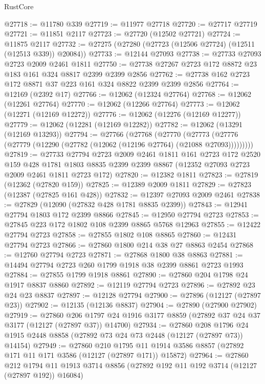 \begin{lexlean}{RustCore}
\begin{coremodule}
@27718 := @11780 @339
@27719 := @11977 @27718
@27720 := @27717 @27719
@27721 := @11851 @2117
@27723 := @27720 (@12502 @27721)
@27724 := @11875 @2117
@27732 := @27275 (@27280 (@27723 (@12506 @27724) (@12511 (@12513 @339)) @20084))
@27733 := @12144 @27093
@27738 := @27733 @27093 @2723 @2009 @2461 @1811
@27750 := @27738 @27267 @2723 @172 @8872 @23 @183 @161 @324 @8817 @2399 @2399 @2856
@27762 := @27738 @162 @2723 @172 @8871 @37 @223 @161 @324 @8822 @2399 @2399 @2856
@27764 := @12169 (@2392 @17)
@27766 := @12062 (@12324 @27764)
@27768 := @12062 (@12261 @27764)
@27770 := @12062 (@12266 @27764)
@27773 := @12062 (@12271 (@12169 @12272))
@27776 := @12062 (@12276 (@12169 @12277))
@27779 := @12062 (@12281 (@12169 @12282))
@27782 := @12062 (@13291 (@12169 @13293))
@27794 := @27766
    (@27768
      (@27770
        (@27773 (@27776 (@27779 (@12290 (@27782 (@12062 (@12196 @27764) (@21088 @27093)))))))))
@27819 := @27733
    @27794
    @2723
    @2009
    @2461
    @1811
    @161
    @2723
    @172
    @2520
    @159
    @428
    @1781
    @1803
    @8835
    @2399
    @2399
    @8867
    (@12352 @27093 @2723 @2009 @2461 @1811 @2723 @172)
@27820 := @12382 @1811
@27823 := @27819 (@12362 (@27820 @159))
@27825 := @12389 @2009 @1811
@27829 := @27823 (@12387 (@27825 @161 @428))
@27832 := @12397 @27093 @2009 @2461
@27838 := @27829 (@12090 (@27832 @428 @1781 @8835 @2399))
@27843 := @12941 @27794 @1803 @172 @2399 @8866
@27845 := @12950 @27794 @2723
@27853 := @27845 @223 @172 @1802 @108 @2399 @8865 @5768 @12963
@27855 := @12422 @27794 @2723
@27858 := @27855 @1802 @108 @8865
@27860 := @12431 @27794 @2723
@27866 := @27860 @1800 @214 @38 @27 @8863 @2454
@27868 := @12760 @27794 @2723
@27871 := @27868 @1800 @38 @8863
@27881 := @14494 @27794 @2723 @260 @1799 @1918 @38 @2399 @8861 @2723 @1993
@27884 := @27855 @1799 @1918 @8861
@27890 := @27860 @204 @1798 @24 @1917 @8837 @8860
@27892 := @12119 @27794 @2723
@27896 := @27892 @23 @24 @23 @8837
@27897 := @12128 @27794
@27900 := @27896 (@12127 (@27897 @23))
@27902 := @12135 (@12136 @8837)
@27904 := @27890 (@27900 @27902)
@27919 := @27860
    @206
    @1797
    @24
    @1916
    @3177
    @8859
    (@27892 @37 @24 @37 @3177 (@12127 (@27897 @37)) @14700)
@27934 := @27860
    @208
    @1796
    @24
    @1915
    @2448
    @8858
    (@27892 @73 @24 @73 @2448 (@12127 (@27897 @73)) @14154)
@27949 := @27860
    @210
    @1795
    @11
    @1914
    @3586
    @8857
    (@27892 @171 @11 @171 @3586 (@12127 (@27897 @171)) @15872)
@27964 := @27860
    @212
    @1794
    @11
    @1913
    @3714
    @8856
    (@27892 @192 @11 @192 @3714 (@12127 (@27897 @192)) @16084)

\end{coremodule}
\end{lexlean}
